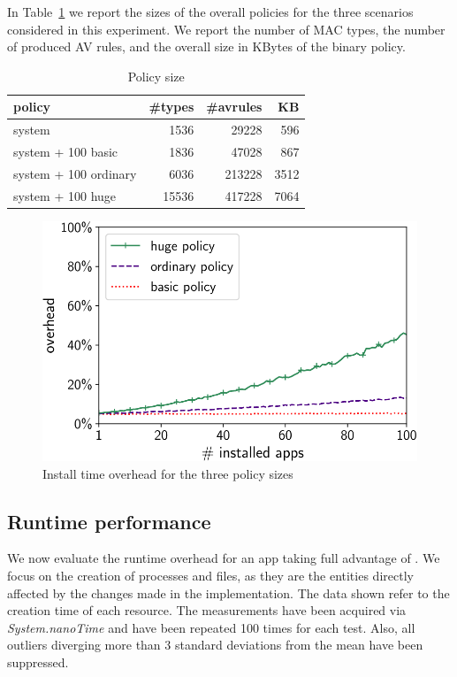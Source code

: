 In Table~\ref{tab:seapp_policy} we report the sizes of the overall
policies for the three scenarios considered in this experiment.  We
report the number of MAC types, the number of produced AV rules, and
the overall size in KBytes of the binary policy.
%
\begin{table}[h!]
	\centering
        \small
	\begin{tabular}{|l|r|r|r|}
		\hline
		\textbf{policy} & \textbf{\#types} & \textbf{\#avrules} & \textbf{KB} \\ \hline
		system & 1536 & 29228 &  596 \\ \hline
		system + 100 basic & 1836 & 47028 &  867 \\ \hline
		system + 100 ordinary & 6036 & 213228 &  3512 \\ \hline
		system + 100 huge & 15536 & 417228 &  7064 \\ \hline
	\end{tabular}
	\caption{Policy size}
	\label{tab:seapp_policy}
\end{table}
%
\begin{figure}[t]
	\centering
	\includegraphics[width=0.7\columnwidth]{chapters/seapp/data/overheads}
	\caption{\label{fig:seapp_install_time} Install time overhead for the three policy sizes}
\end{figure}


\subsection{Runtime performance}

We now evaluate the runtime overhead for an app taking full advantage
of \seapp.  We focus on the creation of processes and files, as they are
the entities directly affected by the changes made in the
implementation.  The data shown refer to the creation time of each
resource.  The measurements have been acquired via
\textit{System.nanoTime} and have been repeated 100 times for each
test.  Also, all outliers diverging more than 3 standard deviations
from the mean have been suppressed.


